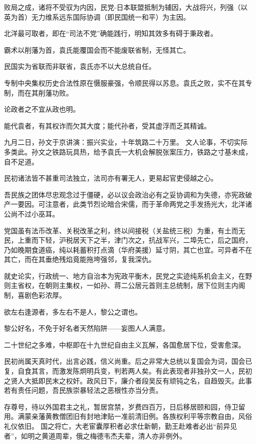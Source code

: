 败局之成，诸将不受驭为内因，民党-日本联盟抵制为辅因，大战将兴，列强（以英为首）无力维系远东国际协调（即民国统一和平）为主因。

北洋最可取者，即在“司法不党”确能践行，明知其效多有碍于秉政者。

霸术以削藩为首，袁氏能覆国会而不能废联省制，无怪其亡。

民国实为省联而非联省，袁氏亦不以大总统自任。

专制中央集权历史合法性原在慑服豪强，令顺民得以苏息。袁氏之败，实不在其专制，而在其削藩功败。

论政者之不宜从政也明。

能代袁者，有其权诈而欠其大度；能代孙者，受其虚浮而乏其精诚。

九月二日，孙文于京讲演：振兴实业，十年筑路二十万里。 文人论事，不切实际多类此。孙文之铁路玩具热，给予袁氏一大机会解脱张案压力，铁路之寸基未成，自不足道。

民初诸法皆不甚重司法独立，法司亦有署无人，更易起官吏侵越之心。

吾民族之团体尽忠观念过于僵硬，必以议会政治必有之妥协调和为失德，亦宪政破产一要因。可注意者，此类节烈论暗合宋儒，而于革命两党之手发扬光大，北洋诸公尚不过小巫耳。

党国虽有法币改革、关税改革之利，终以间接税（关盐统三税）为重，有土而无民，上重而下轻，沪税居天下之半，津门次之，抗战军兴，二埠先亡，后之国府，乃如晚期食道癌，纯以耗蓄积打点滴（华府美援）延寸阴，其亡也宜。可异者不在其亡，而在其垂绝残焰竟能拖垮强邻，复我深仇。

就史论实，行政统一、地方自治本为宪政平衡木，民党之实迹纯系机会主义，在野则主省权，在朝则主集权，一如孙、蒋二公居元首则主总统制，居下位则主内阁制，喜剧色彩浓厚。

欲左右逢源者，多左右不是人，黎公之谓也。

黎公好名，不免于好名者天然陷阱——妄图人人满意。

二十世纪之多难，中枢即在十九世纪自由主义瓦解，各国愈居下位，受害愈深。

民初尚属天真时代，出言必践，信义尚重。后之非常大总统以复国会为词，国会已复，自食其言，而激发陈炯明兵变，判若两人矣。有此表现者非独孙文一人，民初之贤人大抵即民末之权奸。政风日下，廉介者段吴反有顽钝之名，自趋毁灭。此事若有责任问题，吾民族崇暴轻法之恶根性亦当分责。

存尊号，待以外国君主之礼，暂居宫禁，岁费四百万，日后移居颐和园，侍卫留用。满蒙亲藩黄教僧团旧有封地津贴一准前清旧例。各族权利平等宗教自由，风俗礼仪依旧。
国之将亡，大老宦囊厚积者必求仕新朝，勤王赴难者必出“前异见者”，如明之黄道周辈，俄之梅德韦杰夫辈，清人亦非例外。

